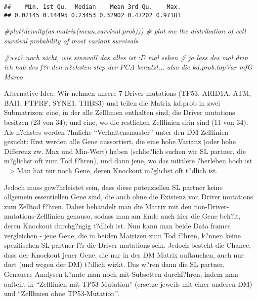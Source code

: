 \documentclass[]{article}
\newenvironment{Shaded}{\begin{snugshade}}{\end{snugshade}}
\newcommand{\CommentTok}[1]{\textcolor[rgb]{0.56,0.35,0.01}{\textit{#1}}}
\begin{document}
\begin{verbatim}
##    Min. 1st Qu.  Median    Mean 3rd Qu.    Max. 
## 0.02145 0.14495 0.23453 0.32902 0.47202 0.97181
\end{verbatim}

\begin{Shaded}
\begin{Highlighting}[]
\CommentTok{#plot(density(as.matrix(mean.survival.prob))) # plot me the distribution of cell survival probability of most variant survivals}

\CommentTok{#wei? noch nicht, wie sinnvoll das alles ist :D mal sehen}
\CommentTok{# ja lass des mal drin ich hab des f?r den n?chsten step der PCA benutzt... also die kd.prob.topVar  mfG Marco}
\end{Highlighting}
\end{Shaded}

Alternative Idea: Wir nehmen unsere 7 Driver mutations (TP53, ARID1A,
ATM, BAI1, PTPRF, SYNE1, THBS3) und teilen die Matrix kd.prob in zwei
Submatrizen: eine, in der alle Zelllinien enthalten sind, die Driver
mutations besitzen (23 von 34); und eine, wo die restlichen Zelllinien
drin sind (11 von 34). Als n?chstes werden ?hnliche ``Verhaltensmuster''
unter den DM-Zelllinien gesucht: Erst werden alle Gene aussortiert, die
eine hohe Varianz (oder hohe Differenz zw. Max und Min-Wert) haben
(schlie?lich suchen wir SL partner, die m?glichst oft zum Tod f?hren),
und dann jene, wo das mittlere ?berleben hoch ist =\textgreater{} Man
hat nur noch Gene, deren Knockout m?glichst oft t?dlich ist.

Jedoch muss gew?hrleistet sein, dass diese potenziellen SL partner keine
allgemein essentiellen Gene sind, die auch ohne die Existenz von Driver
mutations zum Zelltod f?hren. Daher behandelt man die Matrix mit den
non-Driver-mutations-Zelllinien genauso, sodass man am Ende auch hier
die Gene beh?lt, deren Knockout durchg?ngig t?dlich ist. Nun kann man
beide Data frames vergleichen - jene Gene, die in beiden Matrizen zum
Tod f?hren, k?nnen keine spezifischen SL partner f?r die Driver
mutations sein. Jedoch besteht die Chance, dass der Knockout jener Gene,
die nur in der DM Matrix auftauchen, auch nur dort (und wegen der DM)
t?dlich wirkt. Das w?ren dann die SL partner. Genauere Analysen k?nnte
man noch mit Subsetten durchf?hren, indem man aufteilt in ``Zelllinien
mit TP53-Mutation'' (ersetze jeweils mit einer anderen DM) und
``Zelllinien ohne TP53-Mutation''.
\end{document}
